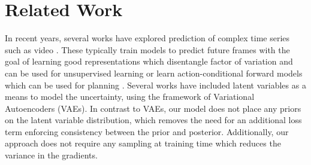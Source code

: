 \documentclass{article}
\begin{document}

\section{Related Work}

In recent years, several works have explored prediction of complex time series such as video \citep{mathieu-iclr-2016,canziani2017cortexnet, VPN}.
These typically train models to predict future frames with the goal of learning good representations which disentangle factor of variation and can be used for unsupervised learning \citep{Srivastava15, Villegas17, DentonB17} or learn action-conditional forward models which can be used for planning \citep{Oh15, FinnGL16, Poke, VPN}.
Several works have included latent variables as a means to model the uncertainty, using the framework of Variational Autoencoders \citep{Babaeizadeh2018, Denton2018} (VAEs).
In contrast to VAEs, our model does not place any priors on the latent variable distribution, which removes the need for an additional loss term enforcing consistency between the prior and posterior.
Additionally, our approach does not require any sampling at training time which reduces the variance in the gradients.
\end{document}
